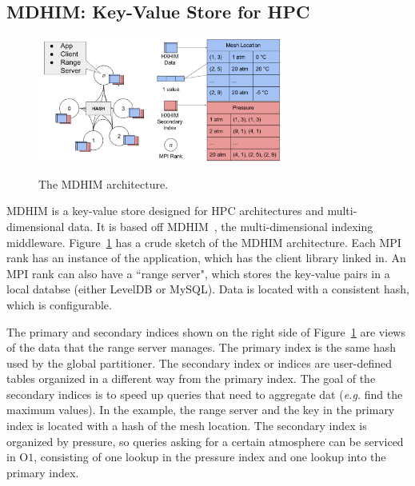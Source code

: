 \subsection{MDHIM: Key-Value Store for HPC}
\label{sec:hxhim}

\begin{figure}[tb]
  \noindent\includegraphics[width=19pc,angle=0]{figures/arch-hxhim.png}\\
  \caption{The MDHIM architecture.}
  \label{fig:arch-hxhim}
\end{figure}

MDHIM is a key-value store designed for HPC architectures and multi-dimensional
data. It is based off MDHIM~\cite{greenberg:hotstorage2015-mdhim}, the
multi-dimensional indexing middleware. Figure~\ref{fig:arch-hxhim} has a crude
sketch of the MDHIM architecture. Each MPI rank has an instance of the
application, which has the client library linked in. An MPI rank can also have
a ``range server", which stores the key-value pairs in a local databse (either
LevelDB or MySQL). Data is located with a consistent hash, which is
configurable.

The primary and secondary indices shown on the right side of
Figure~\ref{fig:arch-hxhim} are views of the data that the range server
manages.  The primary index is the same hash used by the global partitioner.
The secondary index or indices are user-defined tables organized in a different
way from the primary index. The goal of the secondary indices is to speed up
queries that need to aggregate dat ({\it e.g.} find the maximum values). In the
example, the range server and the key in the primary index is located with a
hash of the mesh location. The secondary index is organized by pressure, so
queries asking for a certain atmosphere can be serviced in O\(1\), consisting
of one lookup in the pressure index and one lookup into the primary index.

